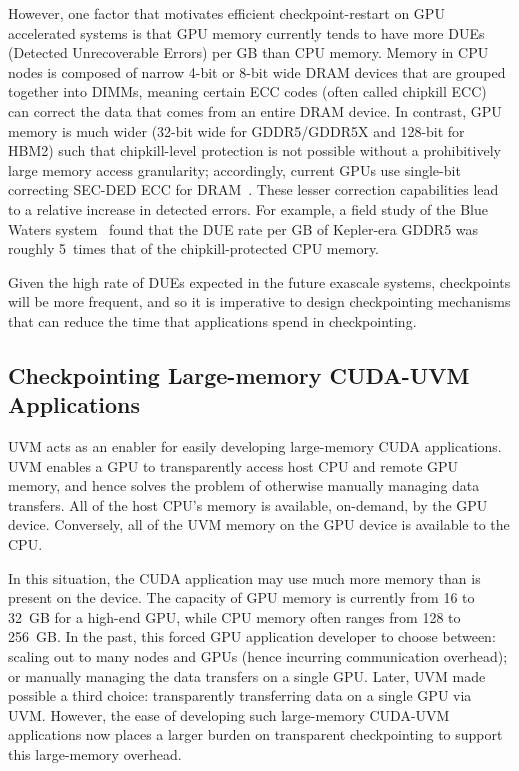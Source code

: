 \documentclass[11pt]{article}
\begin{document}
However, one factor that motivates efficient checkpoint-restart on GPU accelerated systems is that GPU memory currently tends to have more DUEs
(Detected Unrecoverable Errors) per GB than CPU memory. Memory in CPU nodes is composed of narrow 4-bit or 8-bit wide DRAM devices that are grouped together into DIMMs, meaning certain ECC codes (often called chipkill ECC) can correct the data that comes from an entire DRAM device. In contrast, GPU memory is much wider (32-bit wide for GDDR5/GDDR5X and 128-bit for HBM2) such that chipkill-level protection is not possible without a prohibitively large memory access granularity; accordingly, current GPUs use single-bit correcting SEC-DED ECC for DRAM~\cite{nvidia_p100,oliveira2014gpgpus}. These lesser correction capabilities lead to a relative increase in detected errors. For example, a field study of the Blue Waters system~\cite{di2014lessons} found that the DUE rate per GB of Kepler-era GDDR5 was roughly 5~times that of the chipkill-protected CPU memory.


Given
the high rate of DUEs expected in the future exascale systems,
checkpoints will be more frequent, and so it is imperative
to design checkpointing mechanisms that can reduce the time that
applications spend in checkpointing.

\subsection{Checkpointing Large-memory CUDA-UVM Applications}

UVM acts as an enabler for easily developing large-memory CUDA applications.
UVM enables a GPU to transparently access host CPU and remote GPU memory, and
hence solves the problem of otherwise manually managing data transfers.
All of the host CPU's memory is available, on-demand, by the GPU
device. Conversely, all of the UVM memory on the GPU device is available to
the CPU.

In this situation, the CUDA application may use much more memory than
is present on the device.
The capacity of GPU memory is currently from 16 to 32~GB for a high-end GPU,
while CPU memory often ranges from 128 to 256~GB.  In the past, this
forced GPU application developer to choose between:  scaling out to many nodes
and GPUs (hence incurring communication overhead); or manually managing the
data transfers on a single GPU.  Later, UVM made possible a third choice:
transparently transferring data on a single GPU
via UVM.  However, the ease of developing such large-memory CUDA-UVM
applications now places a larger burden on transparent checkpointing to
support this large-memory overhead.
\end{document}
